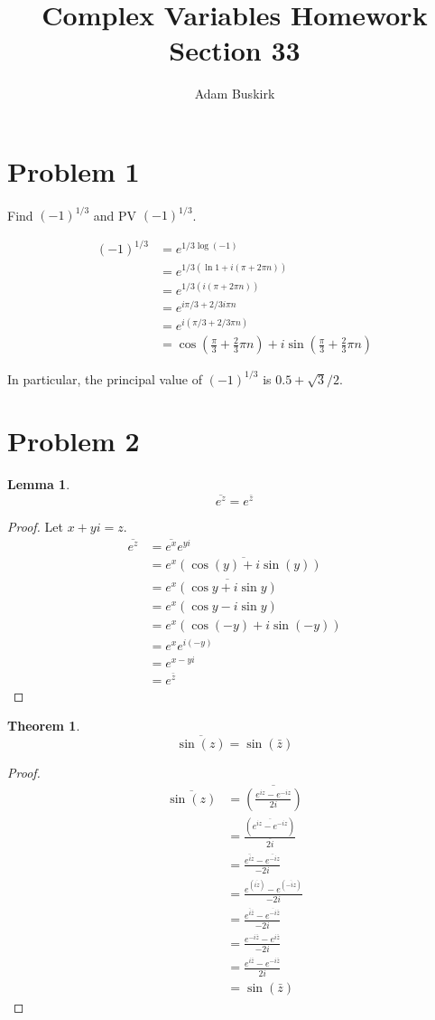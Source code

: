 \documentclass{article}
\title{Complex Variables Homework Section 33}
\author{Adam Buskirk}
\newtheorem{theorem}[subsection]{Theorem}
\newtheorem{lemma}[subsection]{Lemma}
\theoremstyle{definition}
\newcommand{\p}[1]{\left(#1\right)}
\begin{document}
\maketitle

\section{Problem 1}
Find $(-1)^{1/3}$ and PV $(-1)^{1/3}$.

\begin{align*}
(-1)^{1/3} 
&= e^{1/3 \log (-1)} \\
&= e^{1/3 (\ln 1 + i (\pi + 2 \pi n))} \\
&= e^{1/3 (i (\pi + 2 \pi n))} \\
&= e^{i \pi /3 + 2/3 i \pi n} \\
&= e^{i (\pi/3 + 2/3 \pi n)} \\
&= \cos\p{\frac{\pi}{3} + \frac{2}{3} \pi n} 
+ i \sin\p{\frac{\pi}{3} + \frac{2}{3} \pi n}
\end{align*}

In particular, the principal value of $(-1)^{1/3}$ is $0.5+\sqrt{3}/2$.

\section{Problem 2}
\begin{lemma}
\[ \overline{e^{z}} = e^{\bar{z}} \]
\end{lemma}
\begin{proof}
Let $x+yi=z$.
\begin{align*}
\overline{e^z}
&= \overline{e^x} e^{yi} \\
&= \overline{e^x \p{\cos(y)+i\sin(y)}} \\
&= e^x \overline{\p{\cos y + i \sin y}} \\
&= e^x \p{\cos y - i \sin y } \\
&= e^x \p{ \cos (-y) + i \sin (-y) } \\
&= e^x e^{i(-y)} \\
&= e^{x-yi} \\
&= e^{\bar{z}}
\end{align*}
\end{proof}

\begin{theorem}
\[\overline{\sin(z)} = \sin(\bar{z})\]
\end{theorem}
\begin{proof}
\begin{align*}
\overline{\sin(z)}
&= \overline{\p{\frac{e^{iz}-e^{-iz}}{2i}}} \\
&= \frac{\p{\overline{e^{iz}-e^{-iz}}}}{\overline{2i}} \\
&= \frac{ \overline{e^{iz}} - \overline{e^{-iz}} }{-2i} \\
&= \frac{ e^{(\overline{iz})} - e^{(\overline{-iz})} }{-2i} \\
&= \frac{ e^{\bar{i} \bar{z}} - e^{\overline{-i}\bar{z}} }{-2i} \\
&= \frac{ e^{-i \bar{z}} - e^{i\bar{z}} }{-2i} \\
&= \frac{   e^{i\bar{z}} - e^{-i \bar{z}}}{2i} \\
&= \sin(\bar{z})
\end{align*}
\end{proof}
\end{document}
